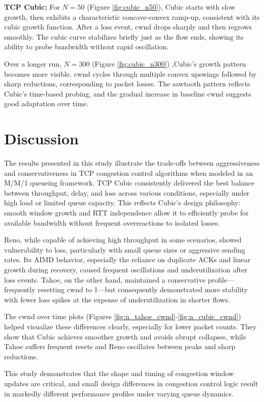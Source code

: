 \documentclass[conference]{IEEEtran}
\begin{document}
\noindent \textbf{TCP Cubic:} For $N=50$ (Figure \ref{fig:cubic_n50}), Cubic starts with slow growth, then exhibits a characteristic concave-convex ramp-up, consistent with its cubic growth function. 
After a loss event, cwnd drops sharply and then regrows smoothly.
The cubic curve stabilizes briefly just as the flow ends, showing its ability to probe bandwidth without rapid oscillation.

Over a longer run, $N=300$ (Figure \ref{fig:cubic_n300}) ,Cubic’s growth pattern becomes more visible.
cwnd cycles through multiple convex upswings followed by sharp reductions, corresponding to packet losses.
The sawtooth pattern reflects Cubic’s time-based probing, and the gradual increase in baseline cwnd suggests good adaptation over time.

\section{Discussion}
The results presented in this study illustrate the trade-offs between aggressiveness and conservativeness in TCP congestion control algorithms when modeled in an M/M/1 queueing framework. 
TCP Cubic consistently delivered the best balance between throughput, delay, and loss across various conditions, especially under high load or limited queue capacity. 
This reflects Cubic's design philosophy: smooth window growth and RTT independence allow it to efficiently probe for available bandwidth without frequent overreactions to isolated losses.

Reno, while capable of achieving high throughput in some scenarios, showed vulnerability to loss, particularly with small queue sizes or aggressive sending rates. 
Its AIMD behavior, especially the reliance on duplicate ACKs and linear growth during recovery, caused frequent oscillations and underutilization after loss events. 
Tahoe, on the other hand, maintained a conservative profile—frequently resetting cwnd to 1—but consequently demonstrated more stability with fewer loss spikes at the expense of underutilization in shorter flows.

The cwnd over time plots (Figures \ref{fig:n_tahoe_cwnd}-\ref{fig:n_cubic_cwnd}) helped visualize these differences clearly, especially for lower packet counts. 
They show that Cubic achieves smoother growth and avoids abrupt collapses, while Tahoe suffers frequent resets and Reno oscillates between peaks and sharp reductions.

This study demonstrates that the shape and timing of congestion window updates are critical, and small design differences in congestion control logic result in markedly different performance profiles under varying queue dynamics.
\end{document}
